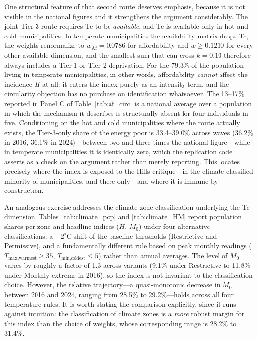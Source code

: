 \documentclass[11pt, a4paper]{article}
\begin{document}
One structural feature of that second route deserves emphasis, because it is not visible in the national figures and it strengthens the argument considerably. The joint Tier-3 route requires Tc to be \emph{available}, and Tc is available only in hot and cold municipalities. In temperate municipalities the availability matrix drops Tc, the weights renormalize to $w_{\mathrm{Af}} = 0.0786$ for affordability and $w \geq 0.1210$ for every other available dimension, and the smallest sum that can cross $k=0.10$ therefore always includes a Tier-1 or Tier-2 deprivation. For the 79.3\% of the population living in temperate municipalities, in other words, affordability \emph{cannot} affect the incidence $H$ at all: it enters the index purely as an intensity term, and the circularity objection has no purchase on identification whatsoever. The 13--17\% reported in Panel C of Table~\ref{tab:af_circ} is a national average over a population in which the mechanism it describes is structurally absent for four individuals in five. Conditioning on the hot and cold municipalities where the route actually exists, the Tier-3-only share of the energy poor is 33.4--39.0\% across waves (36.2\% in 2016, 36.1\% in 2024)---between two and three times the national figure---while in temperate municipalities it is identically zero, which the replication code asserts as a check on the argument rather than merely reporting. This locates precisely where the index is exposed to the Hills critique---in the climate-classified minority of municipalities, and there only---and where it is immune by construction.

An analogous exercise addresses the climate-zone classification underlying the Tc dimension. Tables~\ref{tab:climate_pop} and \ref{tab:climate_HM} report population shares per zone and headline indices ($H$, $M_0$) under four alternative classifications: a $\pm 2^{\circ}$C shift of the baseline thresholds (Restrictive and Permissive), and a fundamentally different rule based on peak monthly readings ($T_\text{max,warmest}\!\geq\!35$, $T_\text{min,coldest}\!\leq\!5$) rather than annual averages. The level of $M_0$ varies by roughly a factor of 1.3 across variants (9.1\% under Restrictive to 11.8\% under Monthly-extreme in 2016), so the index is not invariant to the classification choice. However, the relative trajectory---a quasi-monotonic decrease in $M_0$ between 2016 and 2024, ranging from 28.5\% to 29.2\%---holds across all four temperature rules. It is worth stating the comparison explicitly, since it runs against intuition: the classification of climate zones is a \emph{more} robust margin for this index than the choice of weights, whose corresponding range is 28.2\% to 31.4\%.
\end{document}
